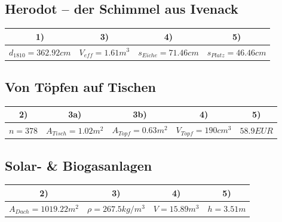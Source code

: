 \documentclass[a4paper, 9pt]{scrartcl}\usepackage[]{graphicx}\usepackage[]{xcolor}
\newenvironment{knitrout}{}{} %
\begin{document}
\subsection*{Herodot – der Schimmel aus Ivenack}
\begin{knitrout}
\color{fgcolor}\begin{table}[!h]
\centering\begingroup\fontsize{10}{12}\selectfont

\begin{tabular}{cccc}
\toprule
\textbf{1)} & \textbf{3)} & \textbf{4)} & \textbf{5)}\\
\midrule
$d_{1810} = 362.92cm$ & $V_{eff} = 1.61m^3$ & $s_{Eiche} = 71.46cm$ & $s_{Platz} = 46.46cm$\\
\bottomrule
\end{tabular}
\endgroup{}
\end{table}

\end{knitrout}
\subsection*{Von Töpfen auf Tischen}
\begin{knitrout}
\color{fgcolor}\begin{table}[!h]
\centering\begingroup\fontsize{10}{12}\selectfont

\begin{tabular}{ccccc}
\toprule
\textbf{2)} & \textbf{3a)} & \textbf{3b)} & \textbf{4)} & \textbf{5)}\\
\midrule
$n = 378$ & $A_{Tisch} = 1.02m^2$ & $A_{Topf} = 0.63m^2$ & $V_{Topf} = 190cm^3$ & $58.9EUR$\\
\bottomrule
\end{tabular}
\endgroup{}
\end{table}

\end{knitrout}
\subsection*{Solar- \& Biogasanlagen}
\begin{knitrout}
\color{fgcolor}\begin{table}[!h]
\centering\begingroup\fontsize{10}{12}\selectfont

\begin{tabular}{cccc}
\toprule
\textbf{2)} & \textbf{3)} & \textbf{4)} & \textbf{5)}\\
\midrule
$A_{Dach} = 1019.22m^2$ & $\rho = 267.5kg/m^3$ & $V = 15.89m^3$ & $h = 3.51m$\\
\bottomrule
\end{tabular}
\endgroup{}
\end{table}

\end{knitrout}
\end{document}
